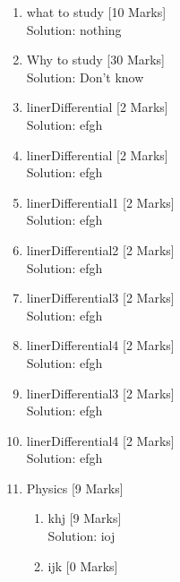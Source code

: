 \documentclass[10pt]{article}
\begin{document}
\pagebreak\begin{enumerate}\item what to study\hfill
[10 Marks]
\\Solution: nothing\\\vspace*{10pt}\item Why to study\hfill
[30 Marks]
\\Solution: Don't know\\\vspace*{10pt}\item linerDifferential\hfill
[2 Marks]
\\Solution: efgh\\\vspace*{10pt}\item linerDifferential\hfill
[2 Marks]
\\Solution: efgh\\\vspace*{10pt}\item linerDifferential1\hfill
[2 Marks]
\\Solution: efgh\\\vspace*{10pt}\item linerDifferential2\hfill
[2 Marks]
\\Solution: efgh\\\vspace*{10pt}\item linerDifferential3\hfill
[2 Marks]
\\Solution: efgh\\\vspace*{10pt}\item linerDifferential4\hfill
[2 Marks]
\\Solution: efgh\\\vspace*{10pt}\item linerDifferential3\hfill
[2 Marks]
\\Solution: efgh\\\vspace*{10pt}\item linerDifferential4\hfill
[2 Marks]
\\Solution: efgh\\\vspace*{10pt}\item Physics\hfill
[9 Marks]
\begin{enumerate}\item khj\hfill
[9 Marks]
\\Solution: ioj\\\vspace*{10pt}\item ijk\hfill
[0 Marks]
\end{enumerate}
\end{enumerate}
\end{document}
